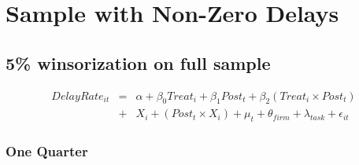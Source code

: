 \documentclass[
]{article}
\begin{document}
\hypertarget{sample-with-non-zero-delays}{%
\section{Sample with Non-Zero
Delays}\label{sample-with-non-zero-delays}}

\hypertarget{winsorization-on-full-sample}{%
\subsection{5\% winsorization on full
sample}\label{winsorization-on-full-sample}}

\[ \begin{aligned} DelayRate_{it} &=& \alpha+\beta_0 Treat_i + \beta_1 Post_t + \beta_2 (Treat_i \times Post_t)\\
&+&  X_i + (Post_t \times X_i) + \mu_t + \theta_{firm} + \lambda_{task}+ \epsilon_{it}
\end{aligned}\]

\hypertarget{one-quarter-3}{%
\subsubsection{One Quarter}\label{one-quarter-3}}
\end{document}

